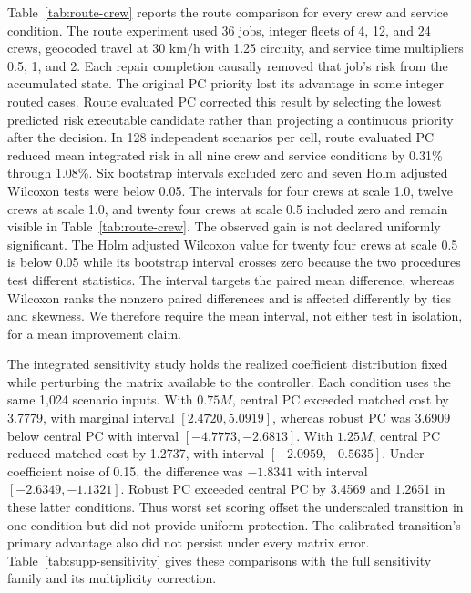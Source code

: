 \documentclass[journal]{IEEEtran}
\begin{document}
Table~\ref{tab:route-crew} reports the route comparison for every crew and
service condition.  The route experiment used 36 jobs, integer fleets of 4, 12, and 24 crews,
geocoded travel at 30 km/h with 1.25 circuity, and service time multipliers
0.5, 1, and 2.  Each repair completion causally removed that job's risk from
the accumulated state.  The original PC priority lost its advantage in some
integer routed cases.  Route evaluated PC corrected this result by selecting the
lowest predicted risk executable candidate rather than projecting a continuous
priority after the decision.  In 128 independent scenarios per cell,
route evaluated PC reduced mean integrated risk in all nine crew and service
conditions by 0.31\% through 1.08\%.  Six bootstrap intervals excluded zero and seven
Holm adjusted Wilcoxon tests were below 0.05.  The intervals for four crews at
scale 1.0, twelve crews at scale 1.0, and twenty four crews at scale 0.5 included
zero and remain visible in
Table~\ref{tab:route-crew}.  The observed gain is not declared
uniformly significant.  The Holm adjusted Wilcoxon value for twenty four crews
at scale 0.5 is below
0.05 while its bootstrap interval crosses zero because the two procedures test
different statistics.  The interval targets the paired mean difference, whereas
Wilcoxon ranks the nonzero paired differences and is affected differently by
ties and skewness.  We therefore require the mean interval, not either test in
isolation, for a mean improvement claim.

The integrated sensitivity study holds the realized coefficient distribution
fixed while perturbing the matrix available to the controller.  Each condition
uses the same 1,024 scenario inputs.  With $0.75M$, central PC exceeded matched
cost by 3.7779, with marginal interval $[2.4720,5.0919]$, whereas robust PC was
3.6909 below central PC with interval $[-4.7773,-2.6813]$.  With $1.25M$, central
PC reduced matched cost by 1.2737, with interval $[-2.0959,-0.5635]$.  Under
coefficient noise of 0.15, the difference was $-1.8341$ with interval
$[-2.6349,-1.1321]$.  Robust PC exceeded central PC by 3.4569 and 1.2651 in
these latter conditions.  Thus worst set scoring offset the underscaled
transition in one condition but did not provide uniform protection.  The
calibrated transition's primary advantage also did not persist under every
matrix error.  Table~\ref{tab:supp-sensitivity} gives these comparisons with the full
sensitivity family and its multiplicity correction.
\end{document}
